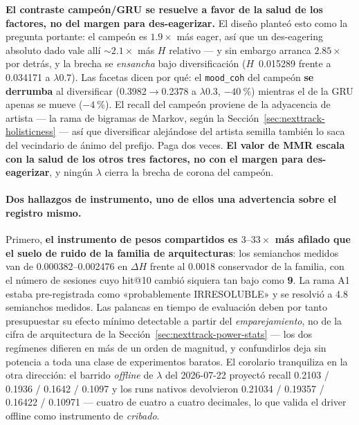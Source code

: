 \documentclass[11pt]{article}
\begin{document}
\textbf{El contraste campeón/GRU se resuelve a favor de la salud de los factores,
no del margen para des-eagerizar.} El diseño planteó esto como la pregunta
portante: el campeón es $\num{1.9}\times$ más eager, así que un des-eagering
absoluto dado vale allí ${\sim}\num{2.1}\times$ más $H$ relativo --- y sin embargo
arranca $\num{2.85}\times$ por detrás, y la brecha se \emph{ensancha} bajo
diversificación ($H$~\num{0.015289} frente a \num{0.034171} a
$\lambda\num{0.7}$). Las facetas dicen por qué: el \texttt{mood\_coh} del campeón
\textbf{se derrumba} al diversificar (\num{0.3982}$\to$\num{0.2378} a
$\lambda\num{0.3}$, $-\SI{40}{\percent}$) mientras el de la GRU apenas se mueve
($-\SI{4}{\percent}$). El recall del campeón proviene de la adyacencia de artista
--- la rama de bigramas de Markov, según la
Sección~\ref{sec:nexttrack-holisticness} --- así que diversificar alejándose del artista
semilla también lo saca del vecindario de ánimo del prefijo. Paga dos veces.
\textbf{El valor de MMR escala con la salud de los otros tres factores, no con el
margen para des-eagerizar}, y ningún $\lambda$ cierra la brecha de corona del
campeón.

\paragraph{Dos hallazgos de instrumento, uno de ellos una advertencia sobre el
registro mismo.} Primero, \textbf{el instrumento de pesos compartidos es
$\numrange{3}{33}\times$ más afilado que el suelo de ruido de la familia de
arquitecturas}: los semianchos medidos van de \numrange{0.000382}{0.002476} en
$\Delta H$ frente al \num{0.0018} conservador de la familia, con el número de
sesiones cuyo hit@10 cambió siquiera tan bajo como \textbf{\num{9}}. La rama A1
estaba pre-registrada como «probablemente IRRESOLUBLE» y se resolvió a \num{4.8}
semianchos medidos. Las palancas en tiempo de evaluación deben por tanto
presupuestar su efecto mínimo detectable a partir del \emph{emparejamiento}, no de
la cifra de arquitectura de la Sección~\ref{sec:nexttrack-power-stats} --- los dos
regímenes difieren en más de un orden de magnitud, y confundirlos deja sin
potencia a toda una clase de experimentos baratos. El corolario tranquiliza en la
otra dirección: el barrido \emph{offline} de $\lambda$ del 2026-07-22 proyectó
recall \num{0.2103} / \num{0.1936} / \num{0.1642} / \num{0.1097} y los runs
nativos devolvieron \num{0.21034} / \num{0.19357} / \num{0.16422} / \num{0.10971}
--- cuatro de cuatro a cuatro decimales, lo que valida el driver offline como
instrumento de \emph{cribado}.
\end{document}
